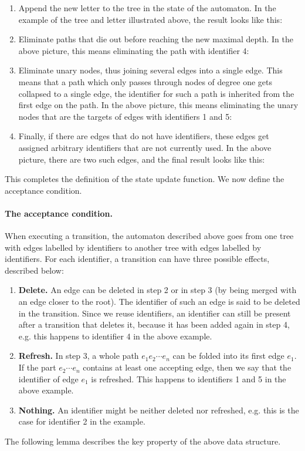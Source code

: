 \begin{enumerate}
	\item Append the new letter to the tree in the state of the automaton. In the example of the tree and letter illustrated above, the result looks like this:
\item Eliminate paths that  die out before reaching the new maximal depth. In the above picture, this means eliminating the path with identifier 4:
\item Eliminate unary nodes, thus joining several edges into a single edge. This means that a path which only passes through nodes of degree one gets collapsed to a single edge, the identifier for such a path is inherited from the first edge on the path. In the above picture, this means eliminating the unary nodes that are the targets of edges with identifiers 1 and 5:
\item Finally, if there are edges that do not have identifiers, these edges get assigned arbitrary identifiers that are not currently used. In the above picture, there are two such edges, and the final result looks like this:
\end{enumerate}


This completes the definition of the state update function. We now define the acceptance condition.


\paragraph*{The acceptance condition.} When executing a transition, the automaton described above goes from one tree with edges labelled by identifiers to another tree with edges labelled by identifiers. For each identifier, a transition can have three possible effects, described below:
\begin{enumerate}
	\item {\bf Delete.} An edge can be deleted in  step 2  or in step 3 (by being  merged with an edge closer to the root). The identifier of such an edge is said to be deleted in the transition. Since we reuse identifiers, an identifier can still be present after a transition that deletes it, because it has been added again in step 4,  e.g. this happens to identifier 4 in the above example.
\item {\bf Refresh.} In step 3, a whole path $e_1 e_2 \cdots e_n$ can be folded into its first edge $e_1$. If the part $e_2 \cdots e_n$ contains at least one accepting edge, then we say that the identifier of edge $e_1$ is refreshed. This happens to identifiers 1 and 5 in the above example.
\item {\bf Nothing.} An identifier might be neither deleted nor refreshed, e.g. this is the case for identifier 2 in the example.
\end{enumerate}
The following lemma describes the key property of the above data structure.

